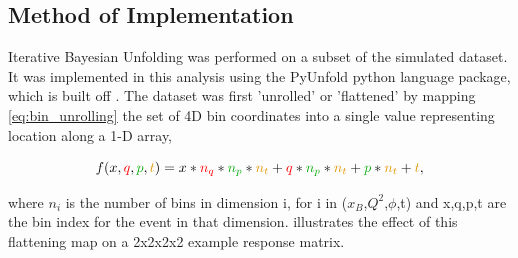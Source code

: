             
    
    \subsection{Method of Implementation}

        Iterative Bayesian Unfolding was performed on a subset of the simulated dataset. It was implemented in this analysis using the PyUnfold \parencite{Bourbeau2018PyUnfold:Unfolding} python language package, which is built off \parencite{DAgostini1995ATheorem}. The dataset was first 'unrolled' or 'flattened' by mapping \ref{eq:bin_unrolling} the set of 4D bin coordinates into a single value representing location along a 1-D array,
    
    \begin{equation}
        f(\textcolor{black}{x},\textcolor{red}{q},\textcolor{darkgreen}{p},\textcolor{darkorange}{t}) = \textcolor{black}{x}*\textcolor{red}{n_q}*\textcolor{darkgreen}{n_p}*\textcolor{darkorange}{n_t} + \textcolor{red}{q}*\textcolor{darkgreen}{n_p}*\textcolor{darkorange}{n_t} + \textcolor{darkgreen}{p}*\textcolor{darkorange}{n_t} + \textcolor{darkorange}{t},
    \end{equation}\label{eq:bin_unrolling}

        where $n_i$ is the number of bins in dimension i, for i in ($x_B$,$Q^2$,$\phi$,t) and x,q,p,t are the bin index for the event in that dimension.  illustrates the effect of this flattening map on a 2x2x2x2 example response matrix. 

